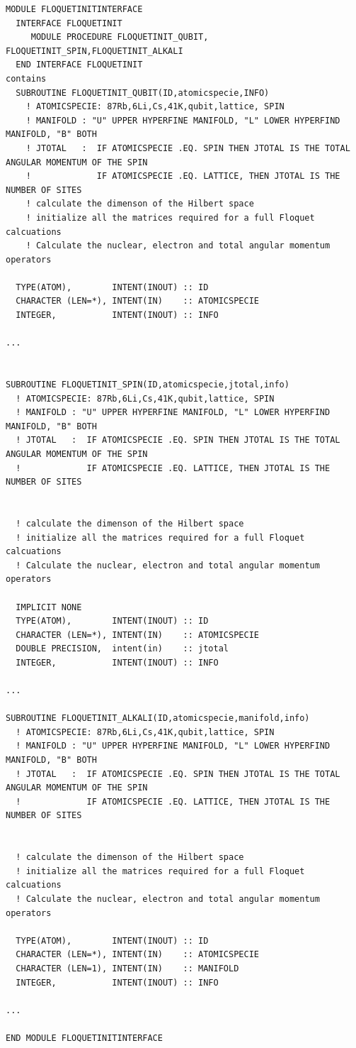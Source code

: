 \documentclass[10pt,a4paper]{article}
\begin{document}
\begin{verbatim}
MODULE FLOQUETINITINTERFACE
  INTERFACE FLOQUETINIT
     MODULE PROCEDURE FLOQUETINIT_QUBIT, FLOQUETINIT_SPIN,FLOQUETINIT_ALKALI
  END INTERFACE FLOQUETINIT
contains
  SUBROUTINE FLOQUETINIT_QUBIT(ID,atomicspecie,INFO)
    ! ATOMICSPECIE: 87Rb,6Li,Cs,41K,qubit,lattice, SPIN
    ! MANIFOLD : "U" UPPER HYPERFINE MANIFOLD, "L" LOWER HYPERFIND MANIFOLD, "B" BOTH
    ! JTOTAL   :  IF ATOMICSPECIE .EQ. SPIN THEN JTOTAL IS THE TOTAL ANGULAR MOMENTUM OF THE SPIN
    !             IF ATOMICSPECIE .EQ. LATTICE, THEN JTOTAL IS THE NUMBER OF SITES
    ! calculate the dimenson of the Hilbert space
    ! initialize all the matrices required for a full Floquet calcuations
    ! Calculate the nuclear, electron and total angular momentum operators
     
  TYPE(ATOM),        INTENT(INOUT) :: ID
  CHARACTER (LEN=*), INTENT(IN)    :: ATOMICSPECIE
  INTEGER,           INTENT(INOUT) :: INFO

...


SUBROUTINE FLOQUETINIT_SPIN(ID,atomicspecie,jtotal,info)
  ! ATOMICSPECIE: 87Rb,6Li,Cs,41K,qubit,lattice, SPIN
  ! MANIFOLD : "U" UPPER HYPERFINE MANIFOLD, "L" LOWER HYPERFIND MANIFOLD, "B" BOTH
  ! JTOTAL   :  IF ATOMICSPECIE .EQ. SPIN THEN JTOTAL IS THE TOTAL ANGULAR MOMENTUM OF THE SPIN
  !             IF ATOMICSPECIE .EQ. LATTICE, THEN JTOTAL IS THE NUMBER OF SITES


  ! calculate the dimenson of the Hilbert space
  ! initialize all the matrices required for a full Floquet calcuations
  ! Calculate the nuclear, electron and total angular momentum operators

  IMPLICIT NONE
  TYPE(ATOM),        INTENT(INOUT) :: ID
  CHARACTER (LEN=*), INTENT(IN)    :: ATOMICSPECIE
  DOUBLE PRECISION,  intent(in)    :: jtotal
  INTEGER,           INTENT(INOUT) :: INFO
  
...

SUBROUTINE FLOQUETINIT_ALKALI(ID,atomicspecie,manifold,info)
  ! ATOMICSPECIE: 87Rb,6Li,Cs,41K,qubit,lattice, SPIN
  ! MANIFOLD : "U" UPPER HYPERFINE MANIFOLD, "L" LOWER HYPERFIND MANIFOLD, "B" BOTH
  ! JTOTAL   :  IF ATOMICSPECIE .EQ. SPIN THEN JTOTAL IS THE TOTAL ANGULAR MOMENTUM OF THE SPIN
  !             IF ATOMICSPECIE .EQ. LATTICE, THEN JTOTAL IS THE NUMBER OF SITES


  ! calculate the dimenson of the Hilbert space
  ! initialize all the matrices required for a full Floquet calcuations
  ! Calculate the nuclear, electron and total angular momentum operators

  TYPE(ATOM),        INTENT(INOUT) :: ID
  CHARACTER (LEN=*), INTENT(IN)    :: ATOMICSPECIE
  CHARACTER (LEN=1), INTENT(IN)    :: MANIFOLD  
  INTEGER,           INTENT(INOUT) :: INFO

...

END MODULE FLOQUETINITINTERFACE


\end{verbatim}
\end{document}
